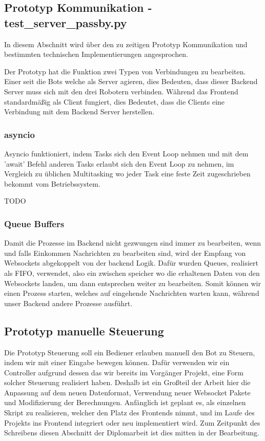 \subsection{Prototyp Kommunikation - test\_server\_passby.py}
In diesem Abschnitt wird über den zu zeitigen Prototyp Kommunikation 
und bestimmten technischen Implementierungen angesprochen.

Der Prototyp hat die Funktion zwei Typen von Verbindungen zu bearbeiten.
Einer seit die Bots welche als Server agieren, 
dies Bedeuten, dass dieser Backend Server muss sich mit den drei Robotern verbinden.
Während das Frontend standardmäßig als Client fungiert, 
dies Bedeutet, dass die Clients eine Verbindung mit dem Backend Server herstellen.


\subsubsection{asyncio}
Asyncio funktioniert, indem Tasks sich den Event Loop nehmen und mit dem 'await' 
Befehl anderen Tasks erlaubt sich den Event Loop zu nehmen, 
im Vergleich zu üblichen Multitasking
wo jeder Task eine feste Zeit zugeschrieben bekommt vom Betriebssystem.

TODO

\subsubsection{Queue Buffers}
Damit die Prozesse im Backend nicht gezwungen sind immer zu bearbeiten, 
wenn und falls Einkommen Nachrichten zu bearbeiten sind, 
wird der Empfang von Websockets abgekoppelt von der backend Logik.
Dafür wurden Queues, realisiert als FIFO, verwendet, also ein zwischen speicher 
wo die erhaltenen Daten von den Websockets landen, um dann entsprechen weiter zu bearbeiten.
Somit können wir einen Prozess starten, welches auf eingehende Nachrichten warten kann, 
während unser Backend andere Prozesse ausführt.

\subsection{Prototyp manuelle Steuerung}
Die Prototyp Steuerung soll ein Bediener erlauben manuell den Bot zu Steuern,
indem wir mit einer Eingabe bewegen können. 
Dafür verwenden wir ein Controller aufgrund dessen das wir bereits im Vorgänger Projekt,
eine Form solcher Steuerung realisiert haben. 
Deshalb ist ein Großteil der Arbeit hier die Anpassung auf dem neuen Datenformat, 
Verwendung neuer Websocket Pakete und Modifizierung der Berechnungen.
% 
Anfänglich ist geplant es, als einzelnen Skript zu realisieren, 
welcher den Platz des Frontends nimmt, 
und im Laufe des Projekts ins Frontend integriert oder neu implementiert wird.
Zum Zeitpunkt des Schreibens diesen Abschnitt der Diplomarbeit 
ist dies mitten in der Bearbeitung.
